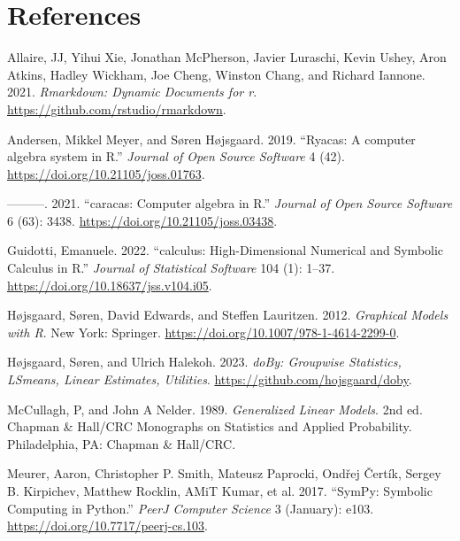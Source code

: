 \hypertarget{references}{%
\section*{References}\label{references}}

\hypertarget{refs}{}
\begin{CSLReferences}
\leavevmode{}%
Allaire, JJ, Yihui Xie, Jonathan McPherson, Javier Luraschi, Kevin Ushey, Aron Atkins, Hadley Wickham, Joe Cheng, Winston Chang, and Richard Iannone. 2021. \emph{Rmarkdown: Dynamic Documents for r}. \url{https://github.com/rstudio/rmarkdown}.

\leavevmode{}%
Andersen, Mikkel Meyer, and Søren Højsgaard. 2019. {``{Ryacas: A computer algebra system in R}.''} \emph{Journal of Open Source Software} 4 (42). \url{https://doi.org/10.21105/joss.01763}.

\leavevmode{}%
---------. 2021. {``{caracas: Computer algebra in R}.''} \emph{Journal of Open Source Software} 6 (63): 3438. \url{https://doi.org/10.21105/joss.03438}.

\leavevmode{}%
Guidotti, Emanuele. 2022. {``{calculus: High-Dimensional Numerical and Symbolic Calculus in R}.''} \emph{Journal of Statistical Software} 104 (1): 1--37. \url{https://doi.org/10.18637/jss.v104.i05}.

\leavevmode{}%
Højsgaard, Søren, David Edwards, and Steffen Lauritzen. 2012. \emph{Graphical Models with {R}}. New York: Springer. \url{https://doi.org/10.1007/978-1-4614-2299-0}.

\leavevmode{}%
Højsgaard, Søren, and Ulrich Halekoh. 2023. \emph{{doBy: Groupwise Statistics, LSmeans, Linear Estimates, Utilities}}. \url{https://github.com/hojsgaard/doby}.

\leavevmode{}%
McCullagh, P, and John A Nelder. 1989. \emph{{Generalized Linear Models}}. 2nd ed. Chapman \& Hall/CRC Monographs on Statistics and Applied Probability. Philadelphia, PA: Chapman \& Hall/CRC.

\leavevmode{}%
Meurer, Aaron, Christopher P. Smith, Mateusz Paprocki, Ondřej Čertík, Sergey B. Kirpichev, Matthew Rocklin, AMiT Kumar, et al. 2017. {``SymPy: Symbolic Computing in Python.''} \emph{PeerJ Computer Science} 3 (January): e103. \url{https://doi.org/10.7717/peerj-cs.103}.


\end{CSLReferences}
